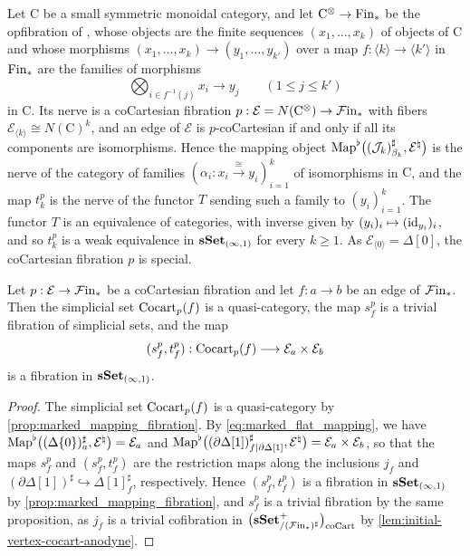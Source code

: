 \documentclass[10pt,reqno]{amsart}
\begin{document}
\begin{ex}%
\label{ex:ordinary_symmetric_monoidal}
Let $\mathrm C$ be a small symmetric monoidal category, and let
$\mathrm C^\otimes\to\mathrm{Fin}_*$ be the opfibration of
\cite[Construction~2.0.0.1]{LurieHA}, whose objects are the finite
sequences $(x_1,\ldots,x_k)$ of objects of $\mathrm C$ and whose
morphisms $(x_1,\ldots,x_k)\to(y_1,\ldots,y_{k'})$ over a map
$f:\langle k\rangle\to\langle k'\rangle$ in $\mathrm{Fin}_*$ are the
families of morphisms
\[
\bigotimes_{i\in f^{-1}(j)}x_i\longrightarrow y_j
\qquad(1\leq j\leq k')
\]
in $\mathrm C$. Its nerve is a coCartesian fibration
$p:\mathcal E=N(\mathrm C^\otimes)\to\mathcal{F}\mathrm{in}_*$ with fibers
$\mathcal E_{\langle k\rangle}\cong N(\mathrm C)^k$, and an edge of
$\mathcal E$ is $p$-coCartesian if and only if all its components
are isomorphisms. Hence the mapping object
$\operatorname{Map}^\flat\bigl((\mathcal J_k)^\sharp_{\beta_k},
\mathcal E^\natural\bigr)$ is the nerve of the category of families
$(\alpha_i:x_i\xrightarrow{\cong}y_i)_{i=1}^k$ of isomorphisms in
$\mathrm C$, and the map $t_k^p$ is the nerve of the functor $T$
sending such a family to $(y_i)_{i=1}^k$. The functor $T$ is an
equivalence of categories, with inverse given by
$(y_i)_i\mapsto(\operatorname{id}_{y_i})_i$, and so $t_k^p$ is a weak
equivalence in $\mathbf{sSet}_{(\infty,1)}$ for every $k\geq1$. As
$\mathcal E_{\langle0\rangle}=\Delta[0]$, the coCartesian fibration
$p$ is special.
\end{ex}

\begin{lemma}
\label{lem:cocart_transport_span}
Let $p:\mathcal E\to\mathcal{F}\mathrm{in}_*$ be a coCartesian fibration and let
$f:a\to b$ be an edge of $\mathcal{F}\mathrm{in}_*$. Then the simplicial set
$\operatorname{Cocart}_p(f)$ is a quasi-category, the map $s_f^p$ is a trivial
fibration of simplicial sets, and the map
\[
(s_f^p,t_f^p):\operatorname{Cocart}_p(f)\longrightarrow
\mathcal E_a\times\mathcal E_b
\]
is a fibration in $\mathbf{sSet}_{(\infty,1)}$.
\end{lemma}

\begin{proof}
The simplicial set $\operatorname{Cocart}_p(f)$ is a quasi-category by
\cref{prop:marked_mapping_fibration}. By
\eqref{eq:marked_flat_mapping}, we have
$\operatorname{Map}^\flat\bigl((\Delta\{0\})^\sharp_a,\mathcal E^\natural\bigr)
=\mathcal E_a$ and
$\operatorname{Map}^\flat\bigl((\partial\Delta[1])^\sharp_{f|\partial\Delta[1]},
\mathcal E^\natural\bigr)=\mathcal E_a\times\mathcal E_b$, so that
the maps $s_f^p$ and $(s_f^p,t_f^p)$ are the restriction maps along
the inclusions $j_f$ and
$(\partial\Delta[1])^\sharp\hookrightarrow\Delta[1]^\sharp_f$,
respectively. Hence $(s_f^p,t_f^p)$ is a fibration in
$\mathbf{sSet}_{(\infty,1)}$ by \cref{prop:marked_mapping_fibration}, and
$s_f^p$ is a trivial fibration by the same proposition, as $j_f$
is a trivial cofibration in $\bigl(\mathbf{sSet}^+_{/(\mathcal{F}\mathrm{in}_*)^\sharp}\bigr)_{\mathrm{coCart}}$ by
\cref{lem:initial-vertex-cocart-anodyne}.
\end{proof}
\end{document}
